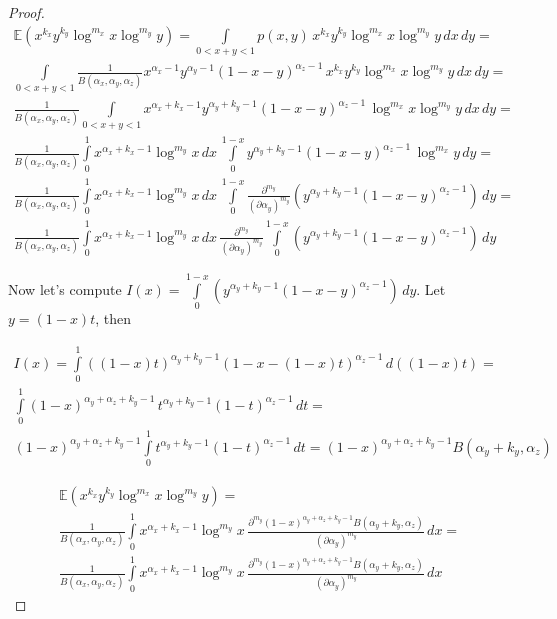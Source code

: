 \documentclass{article}
\begin{document}
\begin{theorem}
\begin{proof}
	\begin{multline*}
	\mathbb{E}(x^{k_x} y^{k_y} \log^{m_x} x \log^{m_y} y) = \int\limits_{0 < x + y < 1} {p(x, y) \, x^{k_x} y^{k_y} \log^{m_x} x \log^{m_y} y \, dx \, dy} = \\ \int\limits_{0 < x + y < 1} {\frac{1}{B(\alpha_x, \alpha_y, \alpha_z)} x^{\alpha_x - 1} y^{\alpha_y - 1} (1 - x - y)^{\alpha_z - 1} \, x^{k_x} y^{k_y} \log^{m_x} x \log^{m_y} y \, dx \, dy} = \\ \frac{1}{B(\alpha_x, \alpha_y, \alpha_z)} \int\limits_{0 < x + y < 1} { x^{\alpha_x + k_x - 1} y^{\alpha_y + k_y - 1} (1 - x - y)^{\alpha_z - 1} \, \log^{m_x} x \log^{m_y} y \, dx \, dy} = \\ \frac{1}{B(\alpha_x, \alpha_y, \alpha_z)} \int\limits_0^1 { x^{\alpha_x + k_x - 1} \log^{m_y}{x} \, dx \, \int\limits_0^{1-x}{ y^{\alpha_y + k_y - 1} (1 - x - y)^{\alpha_z - 1} \, \log^{m_x} y \, dy}} = \\  \frac{1}{B(\alpha_x, \alpha_y, \alpha_z)} \int\limits_0^1 { x^{\alpha_x + k_x - 1} \log^{m_y}{x} \, dx \, \int\limits_0^{1-x}{ \frac{\partial^{m_y}}{(\partial \alpha_y)^{m_y}} (y^{\alpha_y + k_y - 1} (1 - x - y)^{\alpha_z - 1}) \, dy}} = \\ \frac{1}{B(\alpha_x, \alpha_y, \alpha_z)} \int\limits_0^1 { x^{\alpha_x + k_x - 1} \log^{m_y}{x} \, dx \, \frac{\partial^{m_y}}{(\partial \alpha_y)^{m_y}} \int\limits_0^{1-x}{  (y^{\alpha_y + k_y - 1} (1 - x - y)^{\alpha_z - 1}) \, dy}} 
	\end{multline*}
	
	Now let's compute $I(x) = \int\limits_0^{1-x}{  (y^{\alpha_y + k_y - 1} (1 - x - y)^{\alpha_z - 1}) \, dy} $. Let $y = (1 - x)t$, then
	
	\begin{multline*}
	I(x) = \int\limits_0^1{((1 - x)t)^{\alpha_y + k_y - 1} (1 - x - (1 - x)t)^{\alpha_z - 1} \, d((1 - x)t)} = \\ \int\limits_0^1{(1 - x)^{\alpha_y + \alpha_z + k_y - 1} \, t^{\alpha_y + k_y - 1} (1 - t)^{\alpha_z - 1} \, dt} = \\ (1 - x)^{\alpha_y + \alpha_z + k_y - 1} \int\limits_0^1{t^{\alpha_y + k_y - 1} (1 - t)^{\alpha_z - 1} \, dt} = (1 - x)^{\alpha_y + \alpha_z + k_y - 1} B(\alpha_y + k_y, \alpha_z)
	\end{multline*}
	
	\begin{multline*}
	\mathbb{E}(x^{k_x} y^{k_y} \log^{m_x} x \log^{m_y} y) = \\ \frac{1}{B(\alpha_x, \alpha_y, \alpha_z)} \int\limits_0^1 { x^{\alpha_x + k_x - 1} \log^{m_y}{x} \, \frac{\partial^{m_y} (1 - x)^{\alpha_y + \alpha_z + k_y - 1} B(\alpha_y + k_y, \alpha_z)}{(\partial \alpha_y)^{m_y}} \, dx } = \\ \frac{1}{B(\alpha_x, \alpha_y, \alpha_z)} \int\limits_0^1 { x^{\alpha_x + k_x - 1} \log^{m_y}{x} \, \frac{\partial^{m_y} (1 - x)^{\alpha_y + \alpha_z + k_y - 1} B(\alpha_y + k_y, \alpha_z)}{(\partial \alpha_y)^{m_y}} \, dx }
	\end{multline*}
	
\end{proof}
\end{theorem}
\end{document}
